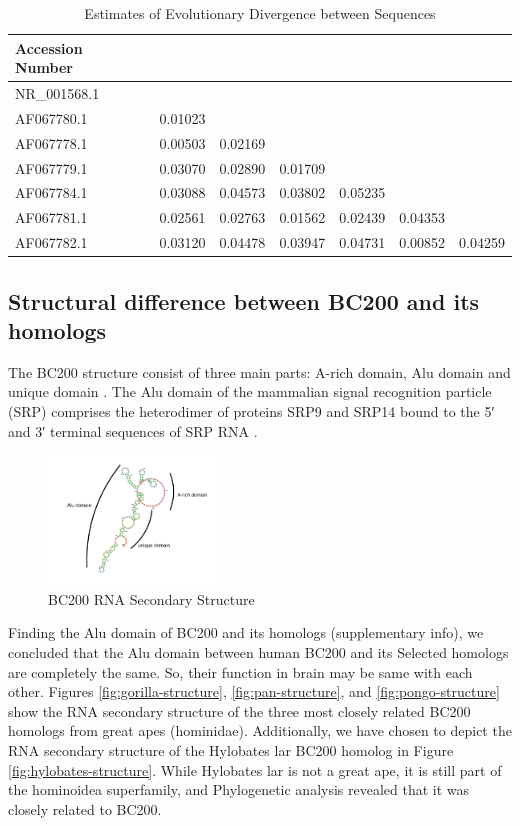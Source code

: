 \documentclass[conference, 11pt]{IEEEtran}
\begin{document}
\begin{table}[h]
  \centering
  \caption{Estimates of Evolutionary Divergence between Sequences}
  \label{tbl:distances}
  \begin{tabular}{lcccccc}
    \toprule
    Accession Number \\
    \midrule
    NR\_001568.1 \\
    AF067780.1 & 0.01023 \\
    AF067778.1 & 0.00503 & 0.02169 \\
    AF067779.1 & 0.03070 & 0.02890 & 0.01709 \\ 
    AF067784.1 & 0.03088 & 0.04573 & 0.03802 & 0.05235 \\
    AF067781.1 & 0.02561 & 0.02763 & 0.01562 & 0.02439 & 0.04353 \\ 
    AF067782.1 & 0.03120 & 0.04478 & 0.03947 & 0.04731 & 0.00852 & 0.04259 \\
    \bottomrule
  \end{tabular}
\end{table}

\subsection{Structural difference between BC200 and its homologs}\label{sec:results-structure}

The BC200 structure consist of three main parts: A-rich domain, Alu domain and unique domain \cite{jung2014rna}.
The Alu domain of the mammalian signal recognition particle (SRP) comprises the heterodimer of proteins SRP9 and SRP14 bound to the 5′ and 3′ terminal sequences of SRP RNA \cite{weichenrieder2000structure}. 
\begin{figure}[h]
  \centering
  \includegraphics[width=0.4\textwidth]{figs/rna-6.png}
  \caption{BC200 RNA Secondary Structure}
  \label{fig:bc200-structure}
\end{figure}

Finding the Alu domain of BC200 and its homologs (supplementary info), we concluded that the Alu domain between human BC200 and its Selected homologs are completely the same. So, their function in brain may be same with each other. 
Figures \ref{fig:gorilla-structure}, \ref{fig:pan-structure}, and \ref{fig:pongo-structure} show the RNA secondary structure of the three most closely related BC200 homologs from great apes (hominidae). 
Additionally, we have chosen to depict the RNA secondary structure of the Hylobates lar BC200 homolog in Figure \ref{fig:hylobates-structure}. 
While Hylobates lar is not a great ape, it is still part of the hominoidea superfamily, and Phylogenetic analysis revealed that it was closely related to BC200.
\end{document}
